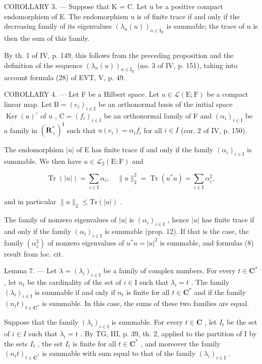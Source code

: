 COROLLARY 3. --- Suppose that K = C. Let u be a positive compact endomorphism of E. The endomorphism u is of finite trace if and only if the decreasing family of its eigenvalues \((\lambda_{n}(u))_{n\in\mathrm{I}_{\mathrm{E}}}\) is summable; the trace of u is then the sum of this family.

By th. 1 of IV, p. 149, this follows from the preceding proposition and the definition of the sequence \((\lambda_n(u))_{n\in \mathrm{I_E}}\) (no. 3 of IV, p. 151), taking into account formula (28) of EVT, V, p. 49.

COROLLARY 4. --- Let F be a Hilbert space. Let \(u \in \mathcal{L}(\mathrm{E};\mathrm{F})\) be a compact linear map. Let \(\mathrm{B} = (e_i)_{i \in \mathrm{I}}\) be an orthonormal basis of the initial space \(\operatorname{Ker}(u)^{\circ}\) of \(u\) , \(\mathrm{C} = (f_i)_{i \in \mathrm{I}}\) be an orthonormal family of F and \((\alpha_{i})_{i\in\mathrm{I}}\) be a family in \((\mathbf{R}_{+}^{*})^{\mathrm{I}}\) such that \(u(e_{i})=\alpha_{i}f_{i}\) for all \(i\in I\) (cor. 2 of IV, p. 150).

The endomorphism \(|u|\) of E has finite trace if and only if the family \((\alpha_{i})_{i\in \mathrm{I}}\) is summable. We then have \(u\in \mathcal{L}_2(\mathrm{E};\mathrm{F})\) and

\[
\operatorname{Tr} (| u |) = \sum_ {i \in \mathrm{I}} \alpha_ {i}, \quad \| u \| _ {2} ^ {2} = \operatorname{Tr} (u ^ {*} u) = \sum_ {i \in \mathrm{I}} \alpha_ {i} ^ {2},\tag{8}
\]

and in particular \(\|u\|_{2}\leqslant\mathrm{Tr}(|u|)\) .

The family of nonzero eigenvalues of \(|u|\) is \((\alpha_{i})_{i\in \mathrm{I}}\) , hence \(|u|\) has finite trace if and only if the family \((\alpha_{i})_{i\in \mathrm{I}}\) is summable (prop. 12). If that is the case, the family \((\alpha_{i}^{2})\) of nonzero eigenvalues of \(u^{*}u = |u|^{2}\) is summable, and formulas (8) result from loc. cit.

Lemma 7. --- Let \(\lambda = (\lambda_i)_{i \in \mathrm{I}}\) be a family of complex numbers. For every \(t \in \mathbf{C}^*\) , let \(n_t\) be the cardinality of the set of \(i \in \mathrm{I}\) such that \(\lambda_i = t\) . The family \((\lambda_i)_{i \in \mathrm{I}}\) is summable if and only if \(n_t\) is finite for all \(t \in \mathbf{C}^*\) and if the family \((n_t t)_{t \in \mathbf{C}^*}\) is summable. In this case, the sums of these two families are equal.

Suppose that the family \((\lambda_{i})_{i\in\mathrm{I}}\) is summable. For every \(t\in\mathbf{C}\) , let \(I_{t}\) be the set of \(i\in I\) such that \(\lambda_{i}=t\) . By TG, III, p. 39, th. 2, applied to the partition of I by the sets \(I_{t}\) , the set \(I_{t}\) is finite for all \(t\in\mathbf{C}^{*}\) , and moreover the family \((n_{t}t)_{t\in\mathbf{C}^{*}}\) is summable with sum equal to that of the family \((\lambda_{i})_{i\in\mathrm{I}}\) .

